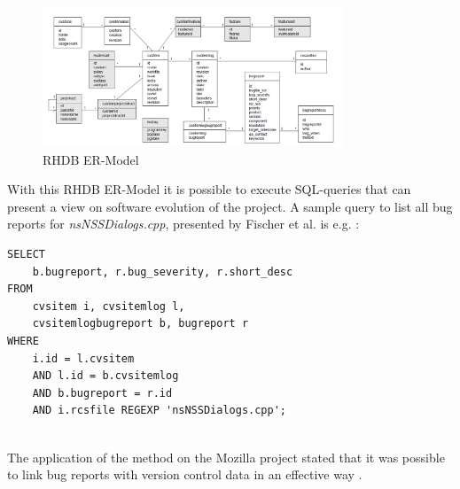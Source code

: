 \begin{figure}[t]
	\centering
	\includegraphics[width=0.8\textwidth]{images/rhdb_er}
	\caption{RHDB ER-Model \cite{fischer2003populating}}
	\label{fig:rhdber}
\end{figure}

With this RHDB ER-Model it is possible to execute SQL-queries that can present a view on software evolution of the project. A sample query to list all bug reports for \textit{nsNSSDialogs.cpp}, presented by Fischer et al. is e.g. \cite{fischer2003populating}:

\begin{verbatim}
SELECT
	b.bugreport, r.bug_severity, r.short_desc
FROM
	cvsitem i, cvsitemlog l,
	cvsitemlogbugreport b, bugreport r
WHERE 	
	i.id = l.cvsitem
	AND l.id = b.cvsitemlog
	AND b.bugreport = r.id
	AND i.rcsfile REGEXP 'nsNSSDialogs.cpp';
	
\end{verbatim}

The application of the method on the Mozilla project stated that it was possible to link bug reports with version control data in an effective way \cite{fischer2003populating}. 


